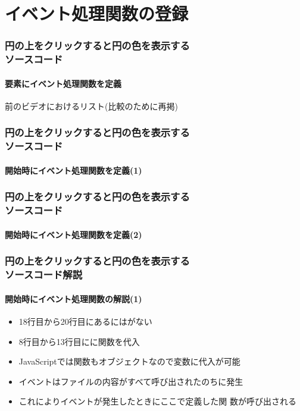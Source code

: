 

\frame{\maketitle}
\section{イベント処理関数の登録}
\begin{frame}[containsverbatim]
 \frametitle{円の上をクリックすると円の色を表示する\\ソースコード}
 \framesubtitle{要素にイベント処理関数を定義}
\centering 前のビデオにおけるリスト(比較のために再掲)
\end{frame}
\begin{frame}[containsverbatim]
 \frametitle{円の上をクリックすると円の色を表示する\\ソースコード}
  \framesubtitle{開始時にイベント処理関数を定義(1)}
\end{frame}
\begin{frame}[containsverbatim]
 \frametitle{円の上をクリックすると円の色を表示する\\ソースコード}
  \framesubtitle{開始時にイベント処理関数を定義(2)}
\end{frame}
\begin{frame}[containsverbatim]
 \frametitle{円の上をクリックすると円の色を表示する\\ソースコード解説}
  \framesubtitle{開始時にイベント処理関数の解説(1)}
 \begin{itemize}
  \item 18行目から20行目にあるにはがない
  \item 8行目から13行目にに関数を代入
  \item JavaScriptでは関数もオブジェクトなので変数に代入が可能
  \item {}イベントはファイルの内容がすべて呼び出されたのちに発生
  \item これによりイベントが発生したときにここで定義した関
        数が呼び出される
 \end{itemize}
\end{frame}
